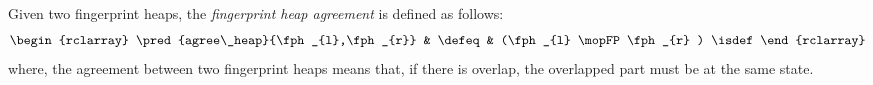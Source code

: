 \begin{defn}
Given two fingerprint heaps, the \emph{fingerprint heap agreement} is defined as follows:
\[
    \begin{rclarray}
        \pred{agree\_heap}{\fph_{l},\fph_{r}} & \defeq  & (\fph_{l} \mopFP \fph_{r} ) \isdef
    \end{rclarray}
\]
where, the agreement between two fingerprint heaps means that, if there is overlap, the overlapped part must be at the same state.
\end{defn}




